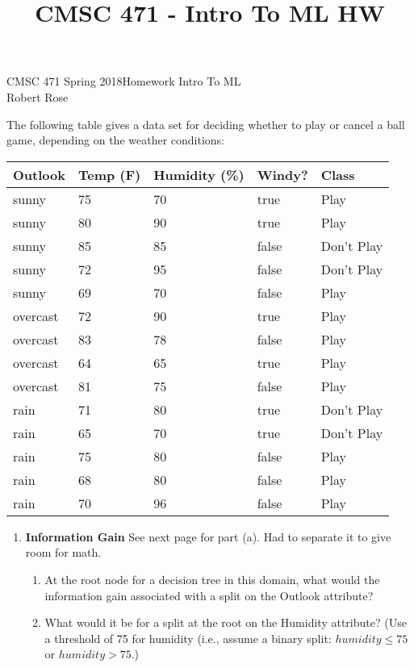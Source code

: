 \documentclass[12pt]{article}
\title{CMSC 471 - Intro To ML HW}
\begin{document}
CMSC 471 Spring 2018\hfill Homework Intro To ML\\
Robert Rose

\hrulefill

The following table gives a data set for deciding whether to play or cancel a ball game, depending on the weather conditions:\\

\begin{center}
\begin{tabular}{l|l|l|l|l}
      \textbf{Outlook} & \textbf{Temp (F)} & \textbf{Humidity (\%)} & \textbf{Windy?} & \textbf{Class}\\
      \hline
      sunny & 75 & 70 & true & Play\\
      sunny & 80 & 90 & true & Play\\
      sunny & 85 & 85 & false & Don't Play\\
        sunny & 72 & 95 & false & Don't Play\\
      sunny & 69 & 70 & false & Play\\
      overcast & 72 & 90 & true & Play\\
      overcast & 83 & 78 & false & Play\\
      overcast & 64 & 65 & true & Play\\
      overcast & 81 & 75 & false & Play\\
      rain & 71 & 80 & true & Don't Play\\
      rain & 65 & 70 & true & Don't Play\\
      rain & 75 & 80 & false & Play\\
      rain & 68 & 80 & false & Play\\
      rain & 70 & 96 & false & Play
\end{tabular}
\end{center}

\begin{enumerate}
\item \textbf{Information Gain} See next page for part (a). Had to separate it to give room for math.
\newpage
\begin{enumerate}
\item At the root node for a decision tree in this domain, what would the information gain associated with a split on the Outlook attribute?
\newpage
\item What would it be for a split at the root on the Humidity attribute? (Use a threshold of 75 for humidity (i.e., assume a binary split: $humidity \leq 75$ or $humidity > 75$.)
\end{enumerate}
\newpage

\end{enumerate}
\end{document}
